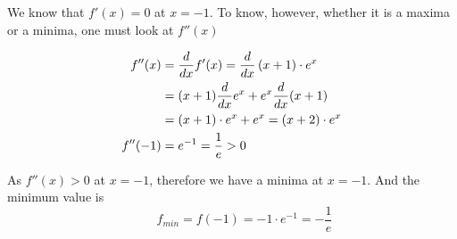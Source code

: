 \documentclass[14pt,fleqn]{extarticle}
\newcommand\dfx{\left(x+1 \right)\cdot e^x }
\newcommand\ddfx{ \left(x+2 \right)\cdot e^x }
\begin{document}
\begin{problem}
\begin{step}
     We know that $f'(x) = 0$ at $x=-1$. To know, however, whether it is a maxima or a minima, one must look at $f''(x)$ 
     
     \begin{align}
	f''(x) &= \ddx f'(x) = \ddx \dfx \\
	&= (x+1)\ddx e^x + e^x\ddx (x+1) \\
	&= (x+1) \cdot e^x + e^x = \ddfx \\
	f''(-1) &= e^{-1} = \frac{1}{e} > 0 
\end{align}  

As $f''(x) > 0$  at $x=-1$, therefore we have a minima at $x=-1$. And the minimum value is 
\[ \qquad f_{min} = f(-1) = -1\cdot e^{-1} = -\frac{1}{e}\]

\end{step}
\end{problem} 
\end{document}
